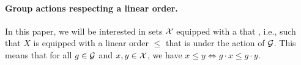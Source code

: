 \paragraph{Group actions respecting a linear order.} In this paper, we will be
interested in sets $\mathcal{X}$ equipped with a  that , i.e., such that $X$ is equipped with a linear order $\leq$
that is  under the action of $\mathcal{G}$. This means that for all $g
\in \mathcal{G}$ and $x,y \in \mathcal{X}$, we have $x \leq y \iff g \cdot x \leq g \cdot y$.


